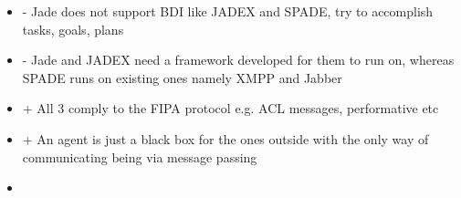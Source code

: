 \documentclass[a4paper, 11pt]{article}
\begin{document}
\begin{itemize}
	\item - Jade does not support BDI like JADEX and SPADE, try to accomplish tasks, goals, plans
	\item - Jade and JADEX need a framework developed for them to run on, whereas SPADE runs on existing ones namely XMPP and Jabber
	\item + All 3 comply to the FIPA protocol e.g. ACL messages, performative etc
	\item + An agent is just a black box for the ones outside with the only way of communicating being via message passing
	\item 
\end{itemize}

\end{document}
